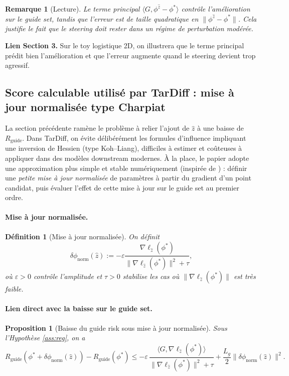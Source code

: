 \documentclass[11pt]{article}
\newtheorem{definition}{Définition}
\newtheorem{proposition}{Proposition}
\newtheorem{remark}{Remarque}
\begin{document}
\begin{remark}[Lecture]
Le terme principal $\langle G,\phi^{\hat z}-\phi^*\rangle$ contrôle l'amélioration sur le guide set, tandis que l'erreur est de taille quadratique en $\|\phi^{\hat z}-\phi^*\|$.
Cela justifie le fait que le steering doit rester dans un régime de perturbation modérée.
\end{remark}

\noindent\textbf{Lien Section 3.}
Sur le toy logistique 2D, on illustrera que le terme principal prédit bien l'amélioration et que l'erreur augmente quand le steering devient trop agressif.

\subsection{Score calculable utilisé par TarDiff : mise à jour normalisée type Charpiat}

La section précédente ramène le problème à relier l'ajout de $\hat z$ à une baisse de $R_{\text{guide}}$.
Dans TarDiff, on évite délibérément les formules d'influence impliquant une inversion de Hessien (type Koh--Liang), difficiles à estimer et coûteuses à appliquer dans des modèles downstream modernes.
À la place, le papier adopte une approximation plus simple et stable numériquement (inspirée de \cite{charpiat}) : définir une \emph{petite mise à jour normalisée} de paramètres à partir du gradient d'un point candidat, puis évaluer l'effet de cette mise à jour sur le guide set au premier ordre.

\paragraph{Mise à jour normalisée.}
\begin{definition}[Mise à jour normalisée]
\label{def:charpiat}
On définit
\[
\delta\phi_{\text{norm}}(\hat z):= -\varepsilon \frac{\nabla \ell_{\hat z}(\phi^*)}{\|\nabla \ell_{\hat z}(\phi^*)\|^2+\tau},
\]
où $\varepsilon>0$ contrôle l'amplitude et $\tau>0$ stabilise les cas où $\|\nabla \ell_{\hat z}(\phi^*)\|$ est très faible.
\end{definition}

\paragraph{Lien direct avec la baisse sur le guide set.}
\begin{proposition}[Baisse du guide risk sous mise à jour normalisée]
\label{prop:charpiat_gain}
Sous l'Hypothèse \ref{ass:reg}, on a
\[
R_{\text{guide}}(\phi^*+\delta\phi_{\text{norm}}(\hat z)) - R_{\text{guide}}(\phi^*)
\le
-\varepsilon\,\frac{\langle G,\nabla \ell_{\hat z}(\phi^*)\rangle}{\|\nabla \ell_{\hat z}(\phi^*)\|^2+\tau}
+
\frac{L_g}{2}\|\delta\phi_{\text{norm}}(\hat z)\|^2.
\]
\end{proposition}
\end{document}
